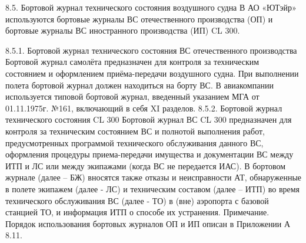 8.5. Бортовой журнал технического состояния воздушного судна
В АО «ЮТэйр» используются бортовые журналы ВС отечественного производства (ОП) и бортовые журналы ВС иностранного производства (ИП) CL 300.

8.5.1. Бортовой журнал технического состояния ВС отечественного производства
Бортовой журнал самолёта предназначен для контроля за техническим состоянием и оформлением приёма-передачи воздушного судна. При выполнении полета бортовой журнал должен находиться на борту ВС.
В авиакомпании используется типовой бортовой журнал, введенный указанием МГА от 01.11.1975г. №161, включающий в себя XI разделов.
8.5.2. Бортовой журнал технического состояния CL 300 
Бортовой журнал ВС CL 300 предназначен для контроля за техническим состоянием ВС и полнотой выполнения работ, предусмотренных программой технического обслуживания данного ВС, оформления процедуры приема-передачи имущества и документации ВС между ИТП и ЛС или между экипажами (когда ВС не передается ИАС).
В бортовом журнале (далее – БЖ) вносятся также отказы и неисправности АТ, обнаруженные в полете экипажем (далее - ЛС) и техническим составом (далее – ИТП) во время технического обслуживания ВС (далее - ТО) в (вне) аэропорта с базовой станцией ТО, и информация ИТП о способе их устранения.
Примечание. Порядок использования бортовых журналов ОП и ИП описан в Приложении А 8.11.


